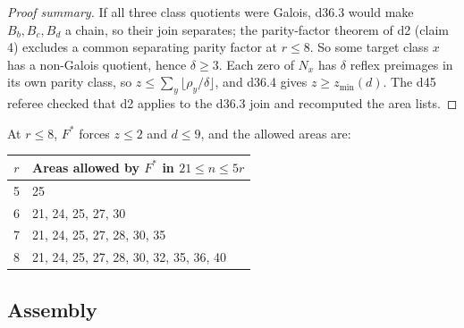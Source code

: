 \documentclass[11pt]{article}
\theoremstyle{definition}
\theoremstyle{remark}
\begin{document}
\begin{proof}[Proof summary]
If all three class quotients were Galois, d36.3 would make $B_b,B_c,B_d$ a
chain, so their join separates; the parity-factor theorem of d2 (claim 4)
excludes a common separating parity factor at $r\le 8$. So some target class
$x$ has a non-Galois quotient, hence $\delta\ge 3$. Each zero of $N_x$ has
$\delta$ reflex preimages in its own parity class, so $z\le\sum_y\lfloor
\rho_y/\delta\rfloor$, and d36.4 gives $z\ge z_{\min}(d)$. The d45 referee
checked that d2 applies to the d36.3 join and recomputed the area lists.
\end{proof}

At $r\le 8$, $F^*$ forces $z\le 2$ and $d\le 9$, and the allowed areas are:

\begin{center}
\small
\begin{tabular}{@{}cl@{}}
\toprule
$r$ & Areas allowed by $F^*$ in $21\le n\le 5r$ \\
\midrule
5 & 25 \\
6 & 21, 24, 25, 27, 30 \\
7 & 21, 24, 25, 27, 28, 30, 35 \\
8 & 21, 24, 25, 27, 28, 30, 32, 35, 36, 40 \\
\bottomrule
\end{tabular}
\end{center}

\subsection{Assembly}
\end{document}
